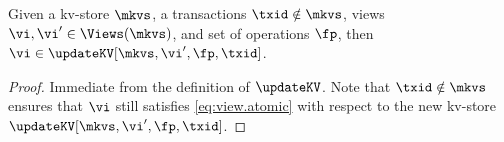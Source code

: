 \begin{lemma}
\label{lem:updatekv.preserveviews}
Given a kv-store $\mkvs$, a transactions $\txid \notin \mkvs$, views $\vi, \vi' \in \Views(\mkvs)$, 
and set of operations $\fp$, then $\vi \in \updateKV[\mkvs, \vi', \fp, \txid]$.
\end{lemma}

\begin{proof}
Immediate from the definition of $\updateKV$. Note that $\txid \notin \mkvs$ ensures that 
$\vi$ still satisfies \eqref{eq:view.atomic} with respect to the new kv-store $\updateKV[\mkvs, \vi', \fp, \txid]$.
\end{proof}
